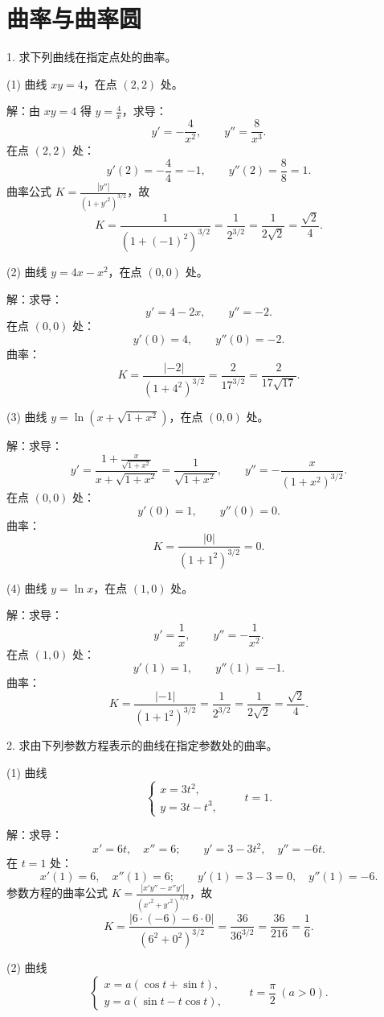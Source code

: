 \section*{曲率与曲率圆}

1. 求下列曲线在指定点处的曲率。

(1) 曲线 \(xy=4\)，在点 \((2,2)\) 处。

解：由 \(xy=4\) 得 \(y=\frac{4}{x}\)，求导：
\[ y'=-\frac{4}{x^{2}},\qquad y''=\frac{8}{x^{3}}. \]
在点 \((2,2)\) 处：
\[ y'(2)=-\frac{4}{4}=-1,\qquad y''(2)=\frac{8}{8}=1. \]
曲率公式 \(K=\frac{|y''|}{(1+y'^{2})^{3/2}}\)，故
\[ K=\frac{1}{(1+(-1)^{2})^{3/2}}=\frac{1}{2^{3/2}}=\frac{1}{2\sqrt{2}}=\frac{\sqrt{2}}{4}. \]

(2) 曲线 \(y=4x-x^{2}\)，在点 \((0,0)\) 处。

解：求导：
\[ y'=4-2x,\qquad y''=-2. \]
在点 \((0,0)\) 处：
\[ y'(0)=4,\qquad y''(0)=-2. \]
曲率：
\[ K=\frac{|-2|}{(1+4^{2})^{3/2}}=\frac{2}{17^{3/2}}=\frac{2}{17\sqrt{17}}. \]

(3) 曲线 \(y=\ln\left(x+\sqrt{1+x^{2}}\right)\)，在点 \((0,0)\) 处。

解：求导：
\[ y'=\frac{1+\frac{x}{\sqrt{1+x^{2}}}}{x+\sqrt{1+x^{2}}}=\frac{1}{\sqrt{1+x^{2}}},\qquad y''=-\frac{x}{(1+x^{2})^{3/2}}. \]
在点 \((0,0)\) 处：
\[ y'(0)=1,\qquad y''(0)=0. \]
曲率：
\[ K=\frac{|0|}{(1+1^{2})^{3/2}}=0. \]

(4) 曲线 \(y=\ln x\)，在点 \((1,0)\) 处。

解：求导：
\[ y'=\frac{1}{x},\qquad y''=-\frac{1}{x^{2}}. \]
在点 \((1,0)\) 处：
\[ y'(1)=1,\qquad y''(1)=-1. \]
曲率：
\[ K=\frac{|-1|}{(1+1^{2})^{3/2}}=\frac{1}{2^{3/2}}=\frac{1}{2\sqrt{2}}=\frac{\sqrt{2}}{4}. \]

2. 求由下列参数方程表示的曲线在指定参数处的曲率。

(1) 曲线
\[ \begin{cases} x=3t^{2},\\ y=3t-t^{3}, \end{cases}\qquad t=1. \]

解：求导：
\[ x'=6t,\quad x''=6;\qquad y'=3-3t^{2},\quad y''=-6t. \]
在 \(t=1\) 处：
\[ x'(1)=6,\quad x''(1)=6;\qquad y'(1)=3-3=0,\quad y''(1)=-6. \]
参数方程的曲率公式 \(K=\frac{|x'y''-x''y'|}{(x'^{2}+y'^{2})^{3/2}}\)，故
\[ K=\frac{|6\cdot(-6)-6\cdot 0|}{(6^{2}+0^{2})^{3/2}}=\frac{36}{36^{3/2}}=\frac{36}{216}=\frac{1}{6}. \]

(2) 曲线
\[ \begin{cases} x=a(\cos t+\sin t),\\ y=a(\sin t-t\cos t), \end{cases}\qquad t=\frac{\pi}{2}\ (a>0). \]

